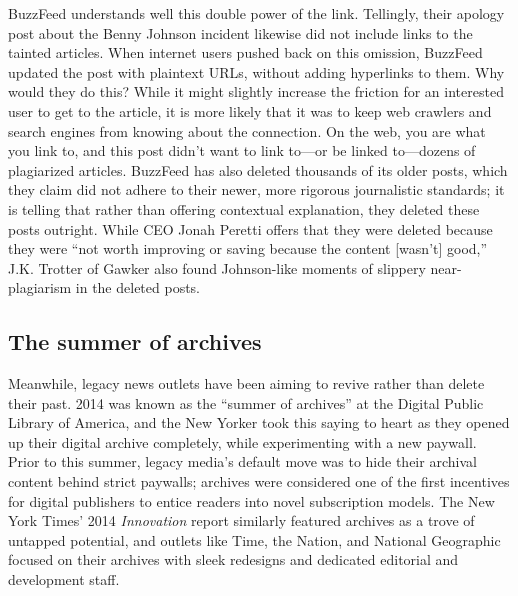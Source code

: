 BuzzFeed understands well this double power of the link. Tellingly, their apology post about the Benny Johnson incident likewise did not include links to the tainted articles. When internet users pushed back on this omission, BuzzFeed updated the post with plaintext URLs, without adding hyperlinks to them.\autocite{smith_editors_2014} Why would they do this? While it might slightly increase the friction for an interested user to get to the article, it is more likely that it was to keep web crawlers and search engines from knowing about the connection. On the web, you are what you link to, and this post didn't want to link to---or be linked to---dozens of plagiarized articles. BuzzFeed has also deleted thousands of its older posts, which they claim did not adhere to their newer, more rigorous journalistic standards; it is telling that rather than offering contextual explanation, they deleted these posts outright. While CEO Jonah Peretti offers that they were deleted because they were ``not worth improving or saving because the content [wasn't] good,'' J.K. Trotter of Gawker also found Johnson-like moments of slippery near-plagiarism in the deleted posts.\autocite{trotter_over_2014, trotter_dont_2014}


\subsection{The summer of archives}

Meanwhile, legacy news outlets have been aiming to revive rather than delete their past. 2014 was known as the ``summer of archives'' at the Digital Public Library of America, and the New Yorker took this saying to heart as they opened up their digital archive completely, while experimenting with a new paywall. Prior to this summer, legacy media's default move was to hide their archival content behind strict paywalls; archives were considered one of the first incentives for digital publishers to entice readers into novel subscription models. The New York Times' 2014 \emph{Innovation} report similarly featured archives as a trove of untapped potential, and outlets like Time, the Nation, and National Geographic focused on their archives with sleek redesigns and dedicated editorial and development staff.

